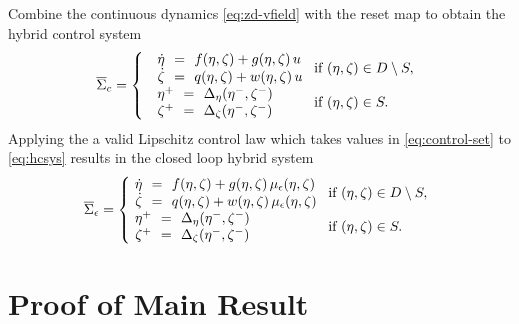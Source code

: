 \documentclass[twocolumn]{article}
\begin{document}
Combine the continuous dynamics \eqref{eq:zd-vfield} with the reset map to obtain the hybrid control system
\begin{align}
  \label{eq:hcsys}
        \HCSbar= \left\{
        \begin{array}{l l}
          \begin{array}{r c l}
            {\dot \eta} &\!\!=\!\!& f(\eta, \zeta) + g(\eta, \zeta) \, u\\
            {\dot \zeta} &\!\!=\!\!& q(\eta, \zeta) + w(\eta, \zeta) \, u
          \end{array} \!\! & \!\! \mbox{if } (\eta, \zeta) \in \D \setminus \S,\\
          \begin{array}{r c l}
            \eta^{+} &\!\!=\!\!& \Delta_{\eta}(\eta^{-}, \zeta^{-})\\
            \zeta^{+} &\!\!=\!\!& \Delta_{\zeta}(\eta^{-}, \zeta^{-})
          \end{array} \!\! & \!\! \mbox{if } (\eta, \zeta) \in \S.
        \end{array}\right.
\end{align}
%
Applying the a valid Lipschitz control law which takes values in \eqref{eq:control-set} to \eqref{eq:hcsys} results in the closed loop hybrid system
%
\begin{align}
  \label{eq:hsys-cl}
        \HSbar_{\epsilon} = \left\{\!\!\!\!
        \begin{array}{l l}
          \begin{array}{r c l}
            {\dot \eta} &\!\!=\!\!& f(\eta, \zeta) + g(\eta, \zeta) \, \mueps(\eta, \zeta)\\
            {\dot \zeta} &\!\!=\!\!& q(\eta, \zeta) + w(\eta, \zeta) \, \mueps(\eta, \zeta)
          \end{array} \!\! & \!\! \mbox{if } (\eta, \zeta) \in \D \setminus \S,\\
          \begin{array}{r c l}
            \eta^{+} &\!\!=\!\!& \Delta_{\eta}(\eta^{-}, \zeta^{-})\\
            \zeta^{+} &\!\!=\!\!& \Delta_{\zeta}(\eta^{-}, \zeta^{-})
          \end{array} \!\! & \!\! \mbox{if } (\eta, \zeta) \in \S.
        \end{array}\right.
\end{align}

\section{Proof of Main Result}
\end{document}
